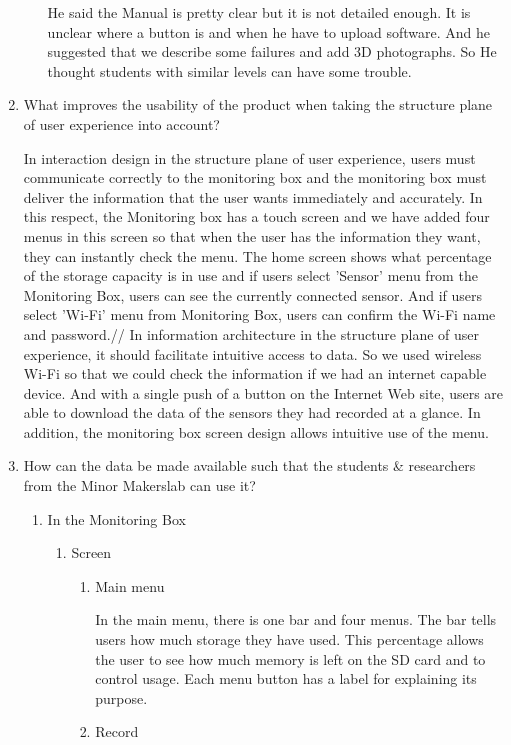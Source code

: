\documentclass[conference]{IEEEtran}
\begin{document}
\begin{enumerate}
\begin{enumerate}
						He said the Manual is pretty clear but it is not detailed enough. It is unclear where a button is and when he have to upload software. And he suggested that we describe some failures and add 3D photographs. So He thought students with similar levels can have some trouble. 
				\end{enumerate}

			\item What improves the usability of the product when taking the structure plane of user experience into account?

				In interaction design in the structure plane of user experience, users must communicate correctly to the monitoring box and the monitoring box must deliver the information that the user wants immediately and accurately. In this respect, the Monitoring box has a touch screen and we have added four menus in this screen so that when the user has the information they want, they can instantly check the menu. The home screen shows what percentage of the storage capacity is in use and if users select 'Sensor' menu from the Monitoring Box, users can see the currently connected sensor. And if users select 'Wi-Fi' menu from Monitoring Box, users can confirm the Wi-Fi name and password.//
				In information architecture in the structure plane of user experience, it should facilitate intuitive access to data. So we used wireless Wi-Fi so that we could check the information if we had an internet capable device. And with a single push of a button on the Internet Web site, users are able to download the data of the sensors they had recorded at a glance. In addition, the monitoring box screen design allows intuitive use of the menu.
\\

			\item How can the data be made available such that the students \& researchers from the Minor Makerslab can use it?
				\begin{enumerate}
					\item In the Monitoring Box
				\begin{enumerate}
			\item Screen
				\begin{enumerate}
					\item Main menu

						In the main menu, there is one bar and four menus. The bar tells users how much storage they have used. This percentage allows the user to see how much memory is left on the SD card and to control usage. Each menu button has a label for explaining its purpose.\\
					\item Record


\end{enumerate}
\end{enumerate}
\end{enumerate}
\end{enumerate}
\end{document}

